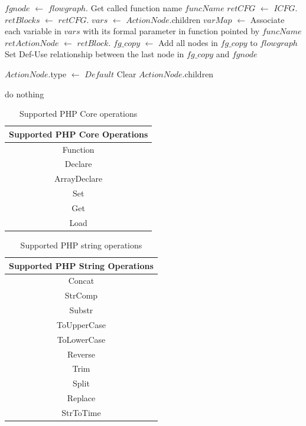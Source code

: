 \begin{algorithm}
\begin{algorithmic}[1]

      \State $fgnode$ $\gets$ $flowgraph$.
      \State Get called function name $funcName$
      \State $retCFG$ $\gets$ $ICFG$.
      \State $retBlocks$ $\gets$ $retCFG$.
      \State $vars$ $\gets$ $ActionNode$.children
      \State $varMap$ $\gets$ Associate each variable in $vars$ with its formal parameter in function pointed by $funcName$
        \State $retActionNode$ $\gets$ $retBlock$.
        \State $fg\_copy$ $\gets$ 
        \State Add all nodes in $fg\_copy$ to $flowgraph$
        \State Set Def-Use relationship between the last node in $fg\_copy$ and $fgnode$
      \EndFor

      \State $ActionNode$.type $\gets$ $Default$
      \State Clear $ActionNode$.children
    \EndCase

      \State do nothing
    \EndCase


\end{algorithmic}
\end{algorithm}


\begin{table}
\centering
\begin{tabular}{c}
Supported PHP Core Operations \\
\hline
Function \\
Declare \\
ArrayDeclare \\
Set \\
Get \\
Load \\
\end{tabular}
\caption{Supported PHP Core operations}
\label{tab:b}
\end{table}


\begin{table}
\centering
\begin{tabular}{c}
Supported PHP String Operations \\
\hline
Concat \\
StrComp \\
Substr \\
ToUpperCase \\
ToLowerCase \\
Reverse \\
Trim \\
Split \\
Replace \\
StrToTime \\
\end{tabular}
\caption{Supported PHP string operations}
\label{tab:a}
\end{table}

